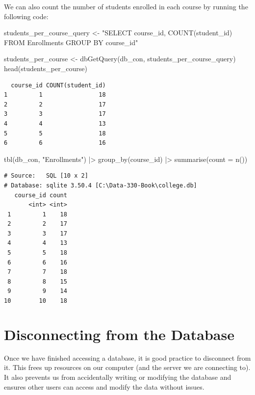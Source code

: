 \documentclass[
  letterpaper,
  DIV=11,
  numbers=noendperiod]{scrreprt}
\newenvironment{Shaded}{\begin{snugshade}}{\end{snugshade}}
\newcommand{\AttributeTok}[1]{\textcolor[rgb]{0.40,0.45,0.13}{#1}}
\newcommand{\FunctionTok}[1]{\textcolor[rgb]{0.28,0.35,0.67}{#1}}
\newcommand{\NormalTok}[1]{\textcolor[rgb]{0.00,0.23,0.31}{#1}}
\newcommand{\OtherTok}[1]{\textcolor[rgb]{0.00,0.23,0.31}{#1}}
\newcommand{\SpecialCharTok}[1]{\textcolor[rgb]{0.37,0.37,0.37}{#1}}
\newcommand{\StringTok}[1]{\textcolor[rgb]{0.13,0.47,0.30}{#1}}
\begin{document}
We can also count the number of students enrolled in each course by
running the following code:

\begin{Shaded}
\begin{Highlighting}[]
\NormalTok{students\_per\_course\_query }\OtherTok{\textless{}{-}}   \StringTok{"SELECT course\_id, COUNT(student\_id)}
\StringTok{                               FROM Enrollments}
\StringTok{                               GROUP BY course\_id"}

\NormalTok{students\_per\_course }\OtherTok{\textless{}{-}} \FunctionTok{dbGetQuery}\NormalTok{(db\_con, students\_per\_course\_query)}
\FunctionTok{head}\NormalTok{(students\_per\_course)}
\end{Highlighting}
\end{Shaded}

\begin{verbatim}
  course_id COUNT(student_id)
1         1                18
2         2                17
3         3                17
4         4                13
5         5                18
6         6                16
\end{verbatim}

\begin{Shaded}
\begin{Highlighting}[]
\FunctionTok{tbl}\NormalTok{(db\_con, }\StringTok{"Enrollments"}\NormalTok{) }\SpecialCharTok{|\textgreater{}} 
  \FunctionTok{group\_by}\NormalTok{(course\_id) }\SpecialCharTok{|\textgreater{}}
  \FunctionTok{summarise}\NormalTok{(}\AttributeTok{count =} \FunctionTok{n}\NormalTok{())}
\end{Highlighting}
\end{Shaded}

\begin{verbatim}
# Source:   SQL [10 x 2]
# Database: sqlite 3.50.4 [C:\Data-330-Book\college.db]
   course_id count
       <int> <int>
 1         1    18
 2         2    17
 3         3    17
 4         4    13
 5         5    18
 6         6    16
 7         7    18
 8         8    15
 9         9    14
10        10    18
\end{verbatim}

\section{Disconnecting from the
Database}\label{disconnecting-from-the-database}

Once we have finished accessing a database, it is good practice to
disconnect from it. This frees up resources on our computer (and the
server we are connecting to). It also prevents us from accidentally
writing or modifying the database and ensures other users can access and
modify the data without issues.
\end{document}
